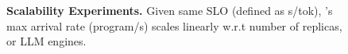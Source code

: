 
\begin{figure}[t]
    \centering
    \vspace{-4mm}
    \caption{\small \textbf{Scalability Experiments.} Given same SLO (defined as s/tok), \text{\name}'s max arrival rate (program/s) scales linearly w.r.t number of replicas, or LLM engines.}  
    \label{fig:scalability}  
\end{figure}

